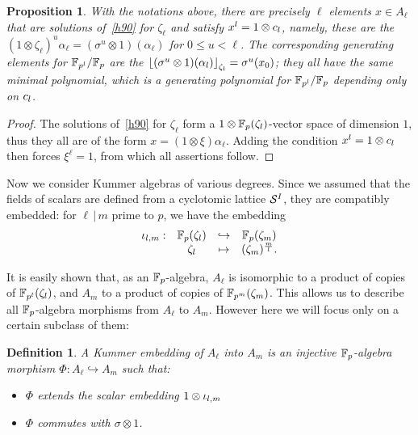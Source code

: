 \documentclass[sigconf]{acmart}
\newtheorem{proposition}[theorem]{Proposition}
\newtheorem{definition}[theorem]{Definition}
\begin{document}
\begin{proposition}
\label{depend}
With the notations above, there are precisely $\ell$ elements $x\in A_\ell$ that are solutions of~\eqref{h90} for $\zeta_\ell$
and satisfy $x^l=1\otimes c_l$, namely, these are the $(1\otimes\zeta_\ell)^u\alpha_\ell=(\sigma^u\otimes 1)(\alpha_\ell)$
for $0\leq u<\ell$.
The corresponding generating elements for $\mathbb{F}_{p^l}/\mathbb{F}_{p}$ are the $\left\lfloor (\sigma^u\otimes 1)(\alpha_l) \right\rfloor_{\zeta_l}=\sigma^u(x_0)$;
they all have the same minimal polynomial, which is a generating polynomial for $\mathbb{F}_{p^l}/\mathbb{F}_{p}$ depending only on $c_l$.
\end{proposition}
\begin{proof}
The solutions of~\eqref{h90} for $\zeta_\ell$ form a $1\otimes\mathbb{F}_{p}(\zeta_{l})$-vector space of dimension $1$,
thus they all are of the form $x=(1\otimes\xi)\alpha_\ell$.
Adding the condition $x^l=1\otimes c_l$ then forces $\xi^\ell=1$,
from which all assertions follow.
\end{proof}

Now we consider Kummer algebras of various degrees.
Since we assumed that the fields of scalars are defined from a cyclotomic lattice $\mathcal{S}^{I}$,
they are compatibly embedded:
for $\ell\,|\,m$ prime to $p$, we have the embedding
\[
\begin{array}{cccc}
  {\iota_{{l},{m}}}: & \mathbb{F}_{p}(\zeta_l) & \hookrightarrow & \mathbb{F}_{p}(\zeta_m) \\
  & \zeta_l & \mapsto & (\zeta_{m})^{\frac{m}{l}}.
\end{array}
\]

It is easily shown that, as an $\mathbb{F}_{p}$-algebra, $A_\ell$ is isomorphic to a product of copies of $\mathbb{F}_{p^l}(\zeta_l)$,
and $A_m$ to a product of copies of $\mathbb{F}_{p^m}(\zeta_m)$.
This allows us to describe all $\mathbb{F}_{p}$-algebra morphisms from $A_\ell$ to $A_m$. However here we will focus only on a certain
subclass of them:
\begin{definition}
\label{Kembedding}
A \emph{Kummer embedding} of $A_\ell$ into $A_m$ is an \emph{injective} $\mathbb{F}_{p}$-algebra morphism $\Phi:A_\ell\hookrightarrow A_m$
such that:
\begin{itemize}
\item $\Phi$ extends the scalar embedding $1\otimes{\iota_{{l},{m}}}$
\item $\Phi$ commutes with $\sigma\otimes1$.
\end{itemize}
\end{definition}
\end{document}
